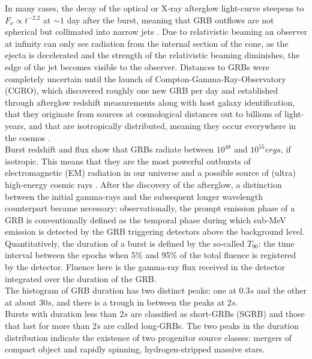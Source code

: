 \documentclass[binding=0.6cm, LaM]{sapthesis}
\begin{document}
        In many cases, the decay of the optical or X-ray afterglow light-curve steepens
        to $F_{\nu} \propto t^{−2.2}$ at $\sim 1$ day after the burst, meaning that GRB outflows
        are not spherical but collimated into narrow jets \cite{183}.
        Due to relativistic beaming an observer at infinity can only see radiation from the internal section of the cone, 
	as the ejecta is decelerated and the strength of the relativistic beaming diminishes,
        the edge of the jet becomes visible to the observer.
        Distances to GRBs were completely uncertain until the launch of Compton-Gamma-Ray-Observatory (CGRO),
        which discovered roughly one new GRB per day and established  
	through afterglow redshift measurements along with host galaxy identification, that they originate 
	from sources at cosmological distances out to billions of light-years, and 
	that are isotropically distributed, meaning they occur everywhere in the cosmos \cite{184}.\\
        Burst redshift and flux show that GRBs radiate between $10^48$ and $10^55 ergs$, if isotropic.
        This means that they are the most powerful outbursts of electromagnetic (EM) radiation in our universe
        and a possible source of (ultra) high-energy cosmic rays \cite{185,186}.
        After the discovery of the afterglow, a distinction between the initial gamma-rays
        and the subsequent longer wavelength counterpart became necessary:
        observationally, the prompt emission phase of a GRB is conventionally defined
        as the temporal phase during which sub-MeV emission is detected by
        the GRB triggering detectors above the background level. \\
        Quantitatively, the duration of a burst is defined by the so-called $T_90$:
        the time interval between the epochs when 5\% and 95\% of the total fluence is registered by the detector.
        Fluence here is the gamma-ray flux received in the detector integrated over the duration of the GRB. \\
        The histogram of GRB duration has two distinct peaks:
        one at $0.3s$ and the other at about $30s$, and there is a trough in between the peaks at $2s$. \\
        Bursts with duration less than $2s$ are classified as short-GRBs (SGRB)
        and those that last for more than $2s$ are called long-GRBs.
	The two peaks in the duration distribution indicate the existence of
        two progenitor source classes: mergers of compact object
        and rapidly spinning, hydrogen-stripped massive stars.
\end{document}
